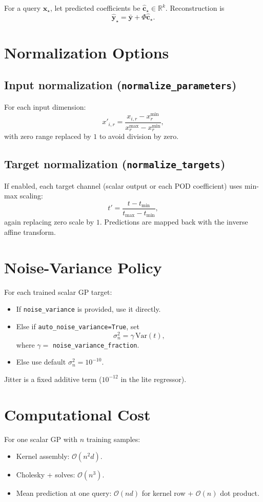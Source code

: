 \documentclass[11pt]{article}
\begin{document}
For a query $\bm{x}_\star$, let predicted coefficients be $\hat{\bm{c}}_\star\in\mathbb{R}^k$.
Reconstruction is
\[
\hat{\bm{y}}_\star = \bar{\bm{y}} + \Phi\hat{\bm{c}}_\star.
\]

\section{Normalization Options}
\subsection*{Input normalization (\texttt{normalize\_parameters})}
For each input dimension:
\[
x'_{i,r}=\frac{x_{i,r}-x^{\min}_r}{x^{\max}_r-x^{\min}_r},
\]
with zero range replaced by $1$ to avoid division by zero.

\subsection*{Target normalization (\texttt{normalize\_targets})}
If enabled, each target channel (scalar output or each POD coefficient) uses min-max scaling:
\[
t'=\frac{t-t_{\min}}{t_{\max}-t_{\min}},
\]
again replacing zero scale by $1$.
Predictions are mapped back with the inverse affine transform.

\section{Noise-Variance Policy}
For each trained scalar GP target:
\begin{itemize}[leftmargin=1.5em]
\item If \texttt{noise\_variance} is provided, use it directly.
\item Else if \texttt{auto\_noise\_variance=True}, set
\[
\sigma_n^2 = \gamma \,\mathrm{Var}(t),
\]
where $\gamma=$ \texttt{noise\_variance\_fraction}.
\item Else use default $\sigma_n^2=10^{-10}$.
\end{itemize}
Jitter is a fixed additive term ($10^{-12}$ in the lite regressor).

\section{Computational Cost}
For one scalar GP with $n$ training samples:
\begin{itemize}[leftmargin=1.5em]
\item Kernel assembly: $\mathcal{O}(n^2 d)$.
\item Cholesky + solves: $\mathcal{O}(n^3)$.
\item Mean prediction at one query: $\mathcal{O}(n d)$ for kernel row + $\mathcal{O}(n)$ dot product.
\end{itemize}
\end{document}
